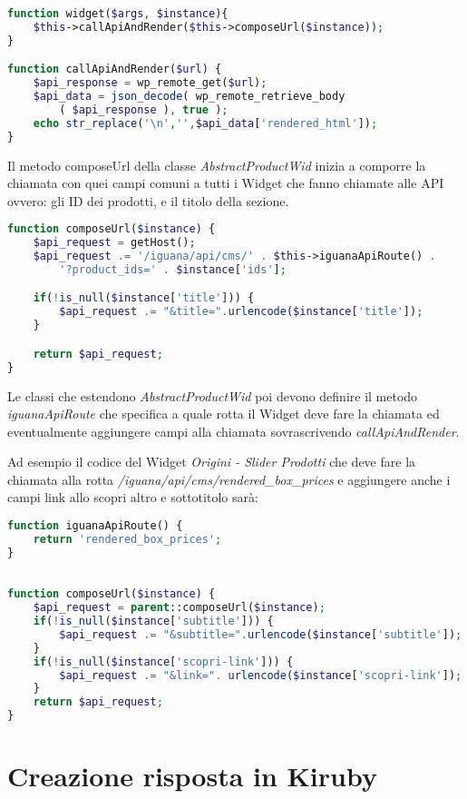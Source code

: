 \begin{lstlisting}[style=customphp, language=Php,caption={I metodi widget e \emph{callApiAndRender} di \emph{AbstractProductWid}}] 
function widget($args, $instance){
	$this->callApiAndRender($this->composeUrl($instance));
}

function callApiAndRender($url) {
	$api_response = wp_remote_get($url);
	$api_data = json_decode( wp_remote_retrieve_body
		( $api_response ), true );
	echo str_replace('\n','',$api_data['rendered_html']);
}
\end{lstlisting}

Il metodo composeUrl della classe \emph{AbstractProductWid} inizia a comporre la chiamata con quei campi
comuni a tutti i Widget che fanno chiamate alle API ovvero: gli ID dei prodotti, e il titolo della sezione.

\begin{lstlisting}[style=customphp, language=Php,caption={Il metodo \emph{composeUrl} di \emph{AbstractProductWid}}] 
function composeUrl($instance) {
    $api_request = getHost();
    $api_request .= '/iguana/api/cms/' . $this->iguanaApiRoute() . 
    	'?product_ids=' . $instance['ids'];

    if(!is_null($instance['title'])) {
        $api_request .= "&title=".urlencode($instance['title']);
    }

    return $api_request;
}

\end{lstlisting}

Le classi che estendono \emph{AbstractProductWid} poi devono definire il metodo \emph{iguanaApiRoute} che specifica
a quale rotta il Widget deve fare la chiamata ed eventualmente aggiungere campi alla chiamata sovrascrivendo \emph{callApiAndRender}.

Ad esempio il codice del Widget \emph{Origini - Slider Prodotti} che deve fare la chiamata alla rotta \emph{/iguana/api/cms/rendered\_box\_prices} e aggiungere  anche i campi link allo scopri altro e sottotitolo sarà:

\begin{lstlisting}[style=customphp, language=Php,caption={Viene sovrascritto \emph{iguanaApiRoute} da \emph{ProductsWidget} per specificare la chiamata da effettuare}] 
function iguanaApiRoute() {
    return 'rendered_box_prices';
}
\end{lstlisting}

\begin{lstlisting}[style=customphp, language=Php,caption={Ridefinendo \emph{composeUrl} vengono aggiunti ulteriori campi specifici del Widget \emph{ProductsWidget}}] 

function composeUrl($instance) {
    $api_request = parent::composeUrl($instance);
    if(!is_null($instance['subtitle'])) {
        $api_request .= "&subtitle=".urlencode($instance['subtitle']);
    }
    if(!is_null($instance['scopri-link'])) {
        $api_request .= "&link=". urlencode($instance['scopri-link']);
    }
    return $api_request;
}
\end{lstlisting}

\section{Creazione risposta in Kiruby}